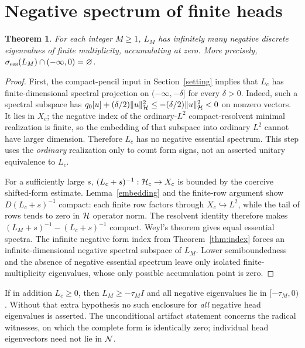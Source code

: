 \documentclass[11pt]{article}
\newtheorem{theorem}{Theorem}[section]
\begin{document}
\section{Negative spectrum of finite heads}\label{spectral}
\begin{theorem}\label{negative-spectrum}
For each integer $M\ge1$, $L_M$ has infinitely many negative discrete eigenvalues of finite multiplicity, accumulating at zero. More precisely, $\sigma_{\rm ess}(L_M)\cap(-\infty,0)=\varnothing$.
\end{theorem}
\begin{proof}
First, the compact-pencil input in Section~\ref{setting} implies that $L_c$ has finite-dimensional spectral projection on $(-\infty,-\delta]$ for every $\delta>0$. Indeed, such a spectral subspace has $q_0[u]+(\delta/2)\lVert u\rVert_{\mathcal H}^2\le-(\delta/2)\lVert u\rVert_{\mathcal H}^2<0$ on nonzero vectors. It lies in $X_c$; the negative index of the ordinary-$L^2$ compact-resolvent minimal realization is finite, so the embedding of that subspace into ordinary $L^2$ cannot have larger dimension. Therefore $L_c$ has no negative essential spectrum. This step uses the \emph{ordinary} realization only to count form signs, not an asserted unitary equivalence to $L_c$.

For a sufficiently large $s$, $(L_c+s)^{-1}:\mathcal H_c\to X_c$ is bounded by the coercive shifted-form estimate. Lemma~\ref{embedding} and the finite-row argument show $D(L_c+s)^{-1}$ compact: each finite row factors through $X_c\hookrightarrow L^2$, while the tail of rows tends to zero in $\mathcal H$ operator norm. The resolvent identity therefore makes $(L_M+s)^{-1}-(L_c+s)^{-1}$ compact. Weyl's theorem gives equal essential spectra. The infinite negative form index from Theorem~\ref{thm:index} forces an infinite-dimensional negative spectral subspace of $L_M$. Lower semiboundedness and the absence of negative essential spectrum leave only isolated finite-multiplicity eigenvalues, whose only possible accumulation point is zero.
\end{proof}
If in addition $L_c\ge0$, then $L_M\ge-\tau_M I$ and all negative eigenvalues lie in $[-\tau_M,0)$. Without that extra hypothesis no such enclosure for \emph{all} negative head eigenvalues is asserted. The unconditional artifact statement concerns the radical witnesses, on which the complete form is identically zero; individual head eigenvectors need not lie in $\mathcal N$.
\end{document}
